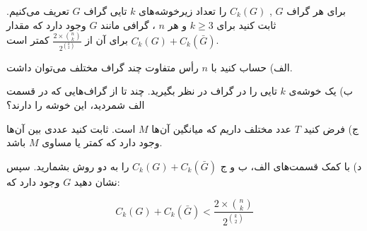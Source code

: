 \EXERCISE
برای هر گراف 
$G$
,
$C_k(G)$
 را تعداد زيرخوشه‌های 
$k$
 تايی گراف 
$G$
  تعريف می‌کنيم. ثابت کنيد برای 
$k \geq 3$
و هر 
$n$
، گرافی مانند 
$G$
 وجود دارد که مقدار 
$C_k(G) + C_k(\bar{G})$
  برای آن از 
$\frac{2 \times \binom n k}{2 ^{\binom k 2}}$
   کمتر است.

الف) حساب کنيد با 
$n$
 رأس متفاوت چند گراف مختلف می‌توان داشت.
  
ب) يک خوشه‌ی 
$k$
تايی را در گراف در نظر بگيريد. چند تا از گراف‌هايی که در قسمت الف شمرديد، اين
خوشه را دارند؟
 
ج) فرض کنيد 
$T$
 عدد مختلف داريم که ميانگين آن‌ها 
$M$
 است. ثابت کنيد عددی بين آن‌ها وجود دارد که کمتر
يا مساوی 
$M$
 باشد.
 
د) با کمک قسمت‌های الف، ب و ج 
$C_k(G) + C_k(\bar{G})$
را به دو روش بشماريد. سپس نشان دهيد 
$G$
 وجود دارد که:
 
$$C_k(G) + C_k(\bar{G}) < \frac{2 \times \binom n k}{2 ^{\binom k 2}}$$